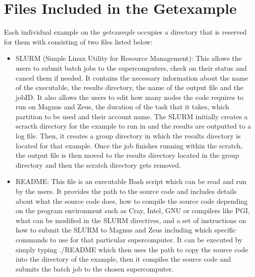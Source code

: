 \section{ Files Included in the Getexample}

Each individual example on the \emph{getexample} occupies a directory that is reserved for them with consisting of two files listed below:

\begin{itemize}
\item SLURM (Simple Linux Utility for Resource Management): This allows the users to submit batch jobs to the supercomputers, check on their status and
cancel them if needed. It contains the necessary information about the name of the executable, the results directory, the name of the output file and
the jobID. It also allows the users to edit how many nodes the code requires to run on Magnus and Zeus, the duration of the task that it takes, which
partition to be used and their account name. The SLURM initially creates a scracth directory for the example to run in and the results are outputted to
a log file. Then, it creates a group directory in which the results directory is located for that example. Once the job finishes running within the
scratch, the output file is then moved to the results directory located in the group directory and then the scratch directory gets removed.
\item README: This file is an executable Bash script which can be read and run by the users. It provides the path to the source code and includes 
details about what the source code does, how to compile the source code depending on the program environment such as Cray, Intel, GNU or compilers like 
PGI, what can be modified in the SLURM directives, and a set of instructions on how to submit the SLURM to Magnus and Zeus including which specific 
commands to use for that particular supercomputer. It can be executed by simply typing ./README which then uses the path to copy the source code into the 
directory of the example, then it compiles the source code and submits the batch job to the chosen supercomputer.
\end{itemize}


